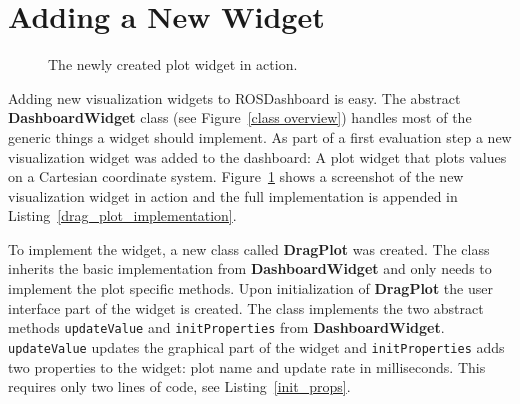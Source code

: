 \section{Adding a New Widget}
\label{plot_widget_section}
\begin{figure}[htb]
  \centering
  \caption{The newly created plot widget in action.}
  \label{plot_widget}
\end{figure}

Adding new visualization widgets to ROSDashboard is easy. The abstract \textbf{DashboardWidget} class (see Figure~\ref{class overview}) handles most of the generic things a widget should implement. As part of a first evaluation step a new visualization widget was added to the dashboard: A plot widget that plots values on a Cartesian coordinate system. Figure~\ref{plot_widget} shows a screenshot of the new visualization widget in action and the full implementation is appended in Listing~\ref{drag_plot_implementation}.

To implement the widget, a new class called \textbf{DragPlot} was created. The class inherits the basic implementation from \textbf{DashboardWidget} and only needs to implement the plot specific methods. Upon initialization of \textbf{DragPlot} the user interface part of the widget is created. The class implements the two abstract methods \verb+updateValue+ and \verb+initProperties+ from \textbf{DashboardWidget}. \verb+updateValue+ updates the graphical part of the widget and \verb+initProperties+ adds two properties to the widget: plot name and update rate in milliseconds. This requires only two lines of code, see Listing~\ref{init_props}.

